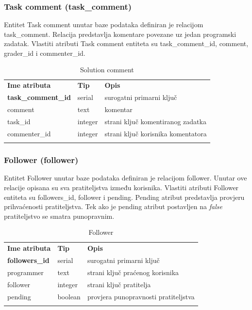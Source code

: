 \documentclass[times, utf8, zavrsni]{fer}
\begin{document}
		\subsubsection{Task comment (task\_comment)}
		Entitet Task comment unutar baze podataka definiran je relacijom task\_comment. Relacija predstavlja komentare povezane uz jedan programski zadatak. Vlastiti atributi Task comment entiteta su task\_comment\_id, comment, grader\_id i commenter\_id. 
		\begin{table}[H]
			\caption{Solution comment}
			\label{tbl:taskcomment}
			\centering
			\begin{tabu} to \textwidth {XXX}
				\tabucline[1.75pt]{-}
				\textbf{Ime atributa} & \textbf{Tip} & \textbf{Opis}\\ 				
				\tabucline[1pt]{-}
				\textbf{task\_comment\_id} & serial & surogatni primarni ključ\\ \hline
				comment & text & komentar\\ \hline
				task\_id & integer & strani ključ komentiranog zadatka\\ \hline
				commenter\_id & integer & strani ključ korisnika komentatora\\ \hline
				\tabucline[1.75pt]{-}
			\end{tabu}
		\end{table}
	
		\subsubsection{Follower (follower)}
		Entitet Follower unutar baze podataka definiran je relacijom follower. Unutar ove relacije opisana su sva pratiteljstva između korisnika. Vlastiti atributi Follower entiteta su followers\_id, follower i pending. Pending atribut predstavlja provjeru prihvaćenosti pratiteljstva. Tek ako je pending atribut postavljen na \textit{false} pratiteljstvo se smatra punopravnim.
		\begin{table}[H]
			\caption{Follower}
			\label{tbl:follower}
			\centering
			\begin{tabu} to \textwidth {XXX}
				\tabucline[1.75pt]{-}
				\textbf{Ime atributa} & \textbf{Tip} & \textbf{Opis}\\ 				
				\tabucline[1pt]{-}
				\textbf{followers\_id} & serial & surogatni primarni ključ\\ \hline
				programmer & text & strani ključ praćenog korisnika\\ \hline
				follower & integer & strani ključ pratitelja\\ \hline
				pending & boolean & provjera punopravnosti pratiteljstva\\ \hline
				\tabucline[1.75pt]{-}
			\end{tabu}
		\end{table}
		
\end{document}
